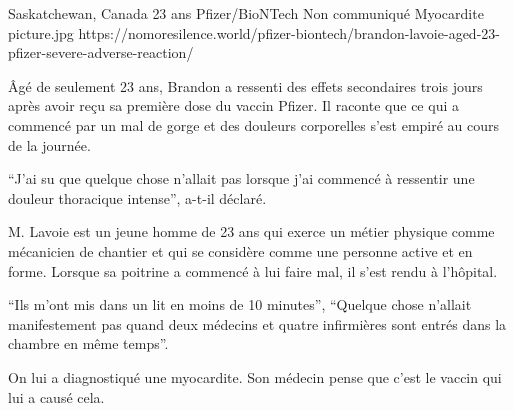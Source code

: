 {Saskatchewan, Canada}
{23 ans}
{Pfizer/BioNTech}
{Non communiqué}
{Myocardite}
{picture.jpg}
{https://nomoresilence.world/pfizer-biontech/brandon-lavoie-aged-23-pfizer-severe-adverse-reaction/}
{

Âgé de seulement 23 ans, Brandon a ressenti des effets secondaires trois jours
après avoir reçu sa première dose du vaccin Pfizer. Il raconte que ce qui a
commencé par un mal de gorge et des douleurs corporelles s'est empiré au cours
de la journée.

“J'ai su que quelque chose n'allait pas lorsque j'ai commencé à ressentir une
douleur thoracique intense”, a-t-il déclaré.

M. Lavoie est un jeune homme de 23 ans qui exerce un métier physique comme
mécanicien de chantier et qui se considère comme une personne active et en
forme. Lorsque sa poitrine a commencé à lui faire mal, il s'est rendu à
l'hôpital.

“Ils m'ont mis dans un lit en moins de 10 minutes”, “Quelque chose n'allait
manifestement pas quand deux médecins et quatre infirmières sont entrés dans la
chambre en même temps”.

On lui a diagnostiqué une myocardite. Son médecin pense que c'est le vaccin qui
lui a causé cela.

}

